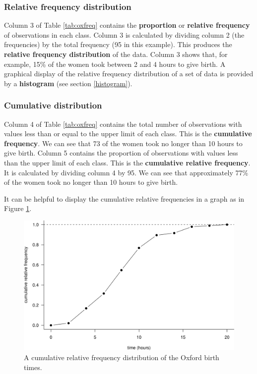 \documentclass[
  british,
]{book}
\begin{document}
\hypertarget{relative-frequency-distribution}{%
\subsubsection*{Relative frequency distribution}\label{relative-frequency-distribution}}

Column 3 of Table \ref{tab:oxfreq} contains the \textbf{proportion} or \textbf{relative frequency} of observations in each class. Column 3 is calculated by dividing column 2 (the frequencies) by the total frequency (95 in this example). This produces the \textbf{relative frequency distribution} of the data. Column 3 shows that, for example, 15\% of the women took between 2 and 4 hours to give birth. A graphical display of the relative frequency distribution of a set of data is provided by a \textbf{histogram} (see section \ref{histogram}).

\hypertarget{cumulative-distribution}{%
\subsubsection*{Cumulative distribution}\label{cumulative-distribution}}

Column 4 of Table \ref{tab:oxfreq} contains the total number of observations with values less than or equal to the upper limit of each class. This is the \textbf{cumulative frequency}. We can see that 73 of the women took no longer than 10 hours to give birth. Column 5 contains the proportion of observations with values less than the upper limit of each class. This is the \textbf{cumulative relative frequency}. It is calculated by dividing column 4 by 95. We can see that approximately 77\% of the women took no longer than 10 hours to give birth.

It can be helpful to display the cumulative relative frequencies in a graph as in Figure \ref{fig:oxcumfreq}.

\begin{figure}

{\centering \includegraphics[width=0.8\linewidth]{images/ox_cum_freq} 

}

\caption{A cumulative relative frequency distribution of the Oxford birth times.}\label{fig:oxcumfreq}
\end{figure}
\FloatBarrier
\end{document}
